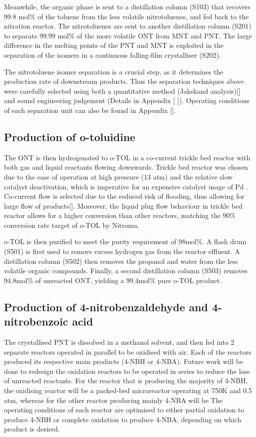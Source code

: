 Meanwhile, the organic phase is sent to a distillation column (S103) that recovers 99.8 mol\% of the toluene from the less volatile nitrotoluenes, and fed back to the nitration reactor. The nitrotoluenes are sent to another distillation column (S201) to separate 99.99 mol\% of the more volatile ONT from MNT and PNT. The large difference in the melting points of the PNT and MNT is exploited in the separation of the isomers in a continuous falling-film crystalliser (S202). 

The nitrotoluene isomer separation is a crucial step, as it determines the production rate of downstream products. Thus the separation techniques above were carefully selected using both a quantitative method (Jakskand analysis)[] and sound engineering judgement (Details in Appendix [ ]). Operating conditions of each separation unit can also be found in Appendix []. 

\subsection{Production of o-toluidine}
The ONT is then hydrogenated to o-TOL in a co-current trickle bed reactor with both gas and liquid reactants flowing downwards. Trickle bed reactor was chosen due to the ease of operation at high pressure (13 atm) and the relative slow catalyst deactivation, which is imperative for an expensive catalyst usage of Pd \cite{vemala_hydrodynamic_nodate}. Co-current flow is selected due to the reduced risk of flooding, thus allowing for large flow of products[]. Moreover, the liquid plug flow behaviour in trickle bed reactor allows for a higher conversion than other reactors, matching the 90\% conversion rate target of o-TOL by Nitroma. 

o-TOL is then purified to meet the purity requirement of 98mol\%. A flash drum (S501) is first used to remove excess hydrogen gas from the reactor effluent. A distillation column (S502) then removes the propanol and water from the less volatile organic compounds. Finally, a second distillation column (S503) removes 94.8mol\% of unreacted ONT, yielding a 99.4mol\% pure o-TOL product.
 
\subsection{Production of 4-nitrobenzaldehyde and 4-nitrobenzoic acid}
The crystallised PNT is dissolved in a methanol solvent, and then fed into 2 separate reactors operated in parallel to be oxidised with air. Each of the reactors produced its respective main products (4-NBH or 4-NBA). Future work will be done to redesign the oxidation reactors to be operated in series to reduce the loss of unreacted reactants. For the reactor that is producing the majority of 4-NBH, the oxidising reactor will be a packed-bed microreactor operating at 750K and 0.5 atm, whereas for the other reactor producing mainly 4-NBA will be  The operating conditions of each reactor are optimised to either partial oxidation to produce 4-NBH or complete oxidation to produce 4-NBA, depending on which product is desired.

